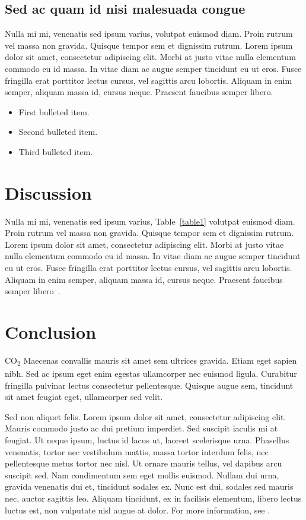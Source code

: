 \documentclass[10pt,letterpaper]{article}
\begin{document}
\subsection*{Sed ac quam id nisi malesuada congue}

Nulla mi mi, venenatis sed ipsum varius, volutpat euismod diam. Proin rutrum vel massa non gravida. Quisque tempor sem et dignissim rutrum. Lorem ipsum dolor sit amet, consectetur adipiscing elit. Morbi at justo vitae nulla elementum commodo eu id massa. In vitae diam ac augue semper tincidunt eu ut eros. Fusce fringilla erat porttitor lectus cursus, vel sagittis arcu lobortis. Aliquam in enim semper, aliquam massa id, cursus neque. Praesent faucibus semper libero.

\begin{itemize}
	\item First bulleted item.
	\item Second bulleted item.
	\item Third bulleted item.
\end{itemize}

\section*{Discussion}
Nulla mi mi, venenatis sed ipsum varius, Table~\ref{table1} volutpat euismod diam. Proin rutrum vel massa non gravida. Quisque tempor sem et dignissim rutrum. Lorem ipsum dolor sit amet, consectetur adipiscing elit. Morbi at justo vitae nulla elementum commodo eu id massa. In vitae diam ac augue semper tincidunt eu ut eros. Fusce fringilla erat porttitor lectus cursus, vel sagittis arcu lobortis. Aliquam in enim semper, aliquam massa id, cursus neque. Praesent faucibus semper libero~\cite{bib3}.

\section*{Conclusion}

CO\textsubscript{2} Maecenas convallis mauris sit amet sem ultrices gravida. Etiam eget sapien nibh. Sed ac ipsum eget enim egestas ullamcorper nec euismod ligula. Curabitur fringilla pulvinar lectus consectetur pellentesque. Quisque augue sem, tincidunt sit amet feugiat eget, ullamcorper sed velit. 

Sed non aliquet felis. Lorem ipsum dolor sit amet, consectetur adipiscing elit. Mauris commodo justo ac dui pretium imperdiet. Sed suscipit iaculis mi at feugiat. Ut neque ipsum, luctus id lacus ut, laoreet scelerisque urna. Phasellus venenatis, tortor nec vestibulum mattis, massa tortor interdum felis, nec pellentesque metus tortor nec nisl. Ut ornare mauris tellus, vel dapibus arcu suscipit sed. Nam condimentum sem eget mollis euismod. Nullam dui urna, gravida venenatis dui et, tincidunt sodales ex. Nunc est dui, sodales sed mauris nec, auctor sagittis leo. Aliquam tincidunt, ex in facilisis elementum, libero lectus luctus est, non vulputate nisl augue at dolor. For more information, see .
\end{document}
